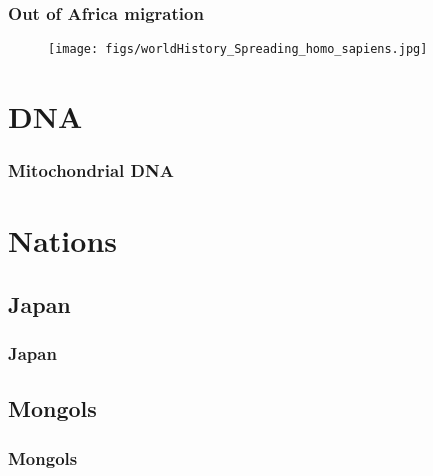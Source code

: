 \begin{frame}\frametitle{Out of Africa migration}\logoEvolution
	\begin{figure}
		\texttt{[image: figs/worldHistory\_Spreading\_homo\_sapiens.jpg]}
	\end{figure}
\end{frame}









\section{DNA}

\begin{frame}\frametitle{Mitochondrial DNA}\logoEvolution

\end{frame}


\section{Nations}

\subsection{Japan}
\begin{frame}\frametitle{Japan}\logoEvolution

\end{frame}

\subsection{Mongols}
\begin{frame}\frametitle{Mongols}\logoEvolution

\end{frame}


